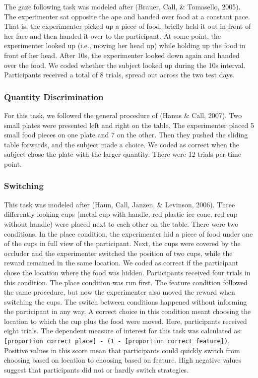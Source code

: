 \documentclass[10pt, letterpaper]{article}
\begin{document}
The gaze following task was modeled after (Brauer, Call, \& Tomasello,
2005). The experimenter sat opposite the ape and handed over food at a
constant pace. That is, the experimenter picked up a piece of food,
briefly held it out in front of her face and then handed it over to the
participant. At some point, the experimenter looked up (i.e., moving her
head up) while holding up the food in front of her head. After 10s, the
experimenter looked down again and handed over the food. We coded
whether the subject looked up during the 10s interval. Participants
received a total of 8 trials, spread out across the two test days.

\hypertarget{quantity-discrimination}{%
\subsubsection{Quantity Discrimination}\label{quantity-discrimination}}

For this task, we followed the general procedure of (Hanus \& Call,
2007). Two small plates were presented left and right on the table. The
experimenter placed 5 small food pieces on one plate and 7 on the other.
Then they pushed the sliding table forwards, and the subject made a
choice. We coded as correct when the subject chose the plate with the
larger quantity. There were 12 trials per time point.

\hypertarget{switching}{%
\subsubsection{Switching}\label{switching}}

This task was modeled after (Haun, Call, Janzen, \& Levinson, 2006).
Three differently looking cups (metal cup with handle, red plastic ice
cone, red cup without handle) were placed next to each other on the
table. There were two conditions. In the place condition, the
experimenter hid a piece of food under one of the cups in full view of
the participant. Next, the cups were covered by the occluder and the
experimenter switched the position of two cups, while the reward
remained in the same location. We coded as correct if the participant
chose the location where the food was hidden. Participants received four
trials in this condition. The place condition was run first. The feature
condition followed the same procedure, but now the experimenter also
moved the reward when switching the cups. The switch between conditions
happened without informing the participant in any way. A correct choice
in this condition meant choosing the location to which the cup plus the
food were moved. Here, participants received eight trials. The dependent
measure of interest for this task was calculated as:
\texttt{{[}proportion\ correct\ place{]}\ -\ (1\ -\ {[}proportion\ correct\ feature{]})}.
Positive values in this score mean that participants could quickly
switch from choosing based on location to choosing based on feature.
High negative values suggest that participants did not or hardly switch
strategies.
\end{document}
